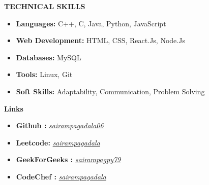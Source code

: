 \documentclass[a4paper,11pt]{article}
\newcommand{\lsep}{-0.5cm}
\newcommand{\resheading}[1]{{\small \colorbox{mygrey}{\begin{minipage}{0.975\textwidth}{\textbf{#1 \vphantom{p\^{E}}}}\end{minipage}}}}
\begin{document}
\resheading{\textbf{TECHNICAL SKILLS} }
\begin{itemize}
\vspace{-0.1mm}

\item \textbf{Languages:}  C++, C, Java, Python, JavaScript

\vspace{-1mm}
\item \textbf{Web Development:}  HTML, CSS, React.Js, Node.Js
\vspace{-1mm}
\item \textbf{Databases:}  MySQL 
\vspace{-1mm}
\item \textbf{Tools:}  Linux, Git 
\vspace{-1mm}
\item \textbf{Soft Skills:}  Adaptability, Communication, Problem Solving 
\vspace{-1.5mm}
\end{itemize}

\resheading{\textbf{Links} }
\begin{itemize}
\vspace{-0.2mm}

\item \textbf{Github :}  \href{http://github.com/sairamapadala06}{\textit{sairampagadala06}}

\vspace{-1mm}
\item \textbf{Leetcode:}  \href{https://leetcode.com/sairampagadala}{\textit{sairampagadala}}
\vspace{-1mm}
\item \textbf{GeekForGeeks :}  \href{https://www.geeksforgeeks.org/user/sairampagpy79/}{\textit{sairampagpy79}}
\vspace{-1mm}
\item \textbf{CodeChef :} \href{https://www.codechef.com/users/sairampagadala} {\textit{sairampagadala}}
\vspace{-2mm}
\end{itemize}




\end{document}
